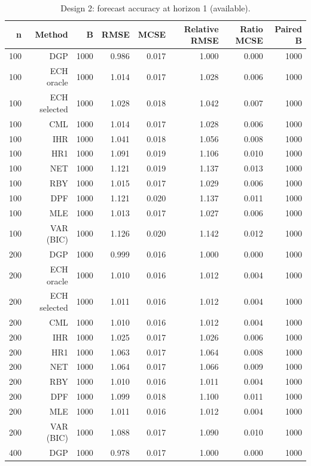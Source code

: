 \begin{table}[p]\centering
\caption{Design 2: forecast accuracy at horizon 1 (available).}
\small
\begin{tabular}{rrrrrrrr}\toprule
n & Method & B & RMSE & MCSE & Relative RMSE & Ratio MCSE & Paired B \\\midrule
100 & DGP & 1000 & 0.986 & 0.017 & 1.000 & 0.000 & 1000 \\
100 & ECH oracle & 1000 & 1.014 & 0.017 & 1.028 & 0.006 & 1000 \\
100 & ECH selected & 1000 & 1.028 & 0.018 & 1.042 & 0.007 & 1000 \\
100 & CML & 1000 & 1.014 & 0.017 & 1.028 & 0.006 & 1000 \\
100 & IHR & 1000 & 1.041 & 0.018 & 1.056 & 0.008 & 1000 \\
100 & HR1 & 1000 & 1.091 & 0.019 & 1.106 & 0.010 & 1000 \\
100 & NET & 1000 & 1.121 & 0.019 & 1.137 & 0.013 & 1000 \\
100 & RBY & 1000 & 1.015 & 0.017 & 1.029 & 0.006 & 1000 \\
100 & DPF & 1000 & 1.121 & 0.020 & 1.137 & 0.011 & 1000 \\
100 & MLE & 1000 & 1.013 & 0.017 & 1.027 & 0.006 & 1000 \\
100 & VAR (BIC) & 1000 & 1.126 & 0.020 & 1.142 & 0.012 & 1000 \\
200 & DGP & 1000 & 0.999 & 0.016 & 1.000 & 0.000 & 1000 \\
200 & ECH oracle & 1000 & 1.010 & 0.016 & 1.012 & 0.004 & 1000 \\
200 & ECH selected & 1000 & 1.011 & 0.016 & 1.012 & 0.004 & 1000 \\
200 & CML & 1000 & 1.010 & 0.016 & 1.012 & 0.004 & 1000 \\
200 & IHR & 1000 & 1.025 & 0.017 & 1.026 & 0.006 & 1000 \\
200 & HR1 & 1000 & 1.063 & 0.017 & 1.064 & 0.008 & 1000 \\
200 & NET & 1000 & 1.064 & 0.017 & 1.066 & 0.009 & 1000 \\
200 & RBY & 1000 & 1.010 & 0.016 & 1.011 & 0.004 & 1000 \\
200 & DPF & 1000 & 1.099 & 0.018 & 1.100 & 0.011 & 1000 \\
200 & MLE & 1000 & 1.011 & 0.016 & 1.012 & 0.004 & 1000 \\
200 & VAR (BIC) & 1000 & 1.088 & 0.017 & 1.090 & 0.010 & 1000 \\
400 & DGP & 1000 & 0.978 & 0.017 & 1.000 & 0.000 & 1000 \\

\end{tabular}
\end{table}
